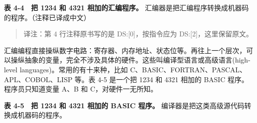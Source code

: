 \textbf{表 4-4　把 1234 和 4321 相加的汇编程序。}
汇编器是把汇编程序转换成机器码的程序。（注释已译成中文）

\begin{Shaded}
\begin{Highlighting}[]
 \OperatorTok{,}      
 \OperatorTok{:[}\OperatorTok{],}    

 \OperatorTok{,}      
 \OperatorTok{:[}\OperatorTok{],}    

 \OperatorTok{,}\OperatorTok{:[}\OperatorTok{]}    
 \OperatorTok{,}\OperatorTok{:[}\OperatorTok{]}    
 \OperatorTok{,}        
 \OperatorTok{:[}\OperatorTok{],}    
\end{Highlighting}
\end{Shaded}

\begin{quote}
译注：第 4 行注释原书写的是 DS:{[}0{]}，按指令应为
DS:{[}2{]}，这里保留原文。
\end{quote}

汇编编程直接操纵数字电路：寄存器、内存地址、状态位等。再往上一个层次，可以操纵抽象的变量，完全不涉及具体的硬件。这些叫编译型语言或高级语言(high-level
languages)。常用的有十来种，比如
C、BASIC、FORTRAN、PASCAL、APL、COBOL、LISP 等。表 4-5 是一个把 1234 和
4321 相加的 BASIC 程序。程序员只知道变量 A、B 和 C，对硬件一无所知。

\textbf{表 4-5　把 1234 和 4321 相加的 BASIC 程序。}
编译器是把这类高级源代码转换成机器码的程序。

\begin{Shaded}
\begin{Highlighting}[]
\end{Highlighting}
\end{Shaded}

